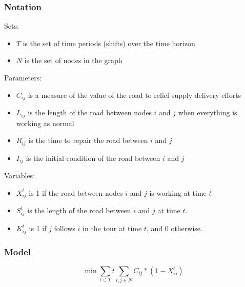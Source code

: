 \documentclass{article}
\begin{document}
	\subsubsection{Notation}
Sets:
	\begin{itemize}
		\item $T$ is the set of time periods (shifts) over the time horizon
		\item $N$ is the set of nodes in the graph
	\end{itemize}

Parameters:
	\begin{itemize}
		\item $C_{ij}$ is a measure of the value of the road to relief supply delivery efforts
		\item $L_{ij}$ is the length of the road between nodes $i$ and $j$ when everything is working as normal
		\item $R_{ij}$ is the time to repair the road between $i$ and $j$
		\item $I_{ij}$ is the initial condition of the road between $i$ and $j$
	\end{itemize}
	
Variables:
	\begin{itemize}
		\item $X_{ij}^t$ is 1 if the road between nodes $i$ and $j$ is working at time $t$
		\item $S_{ij}^t$ is the length of the road between $i$ and $j$ at time $t$. 
		\item $K_{ij}^t$ is 1 if $j$ follows $i$ in the tour at time $t$, and 0 otherwise.	
	\end{itemize}
	
	\subsubsection{Model}
	$$	\min \sum_{t \in T} t \sum_{i,j \in N} C_{ij}*(1-X_{ij}^t) $$
	
\end{document}
